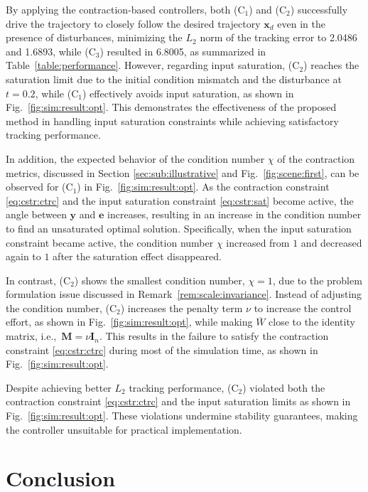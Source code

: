 \documentclass{ifacconf}
\newcommand\ie{\textrm{i.e.,\ }}
\newcommand{\oneErr}{{2.0486}}
\newcommand{\twoErr}{{1.6893}}
\newcommand{\threeErr}{{6.8005}}
\newcommand*{\mv}[1]{\boldsymbol{#1}} %
\newcommand*{\mm}[1]{\boldsymbol{#1}} %
\begin{document}
By applying the contraction-based controllers, both (C$_1$) and (C$_2$) successfully drive the trajectory to closely follow the desired trajectory $\mv{x}_d$ even in the presence of disturbances, minimizing the $L_2$ norm of the tracking error to {\oneErr} and {\twoErr}, while (C$_3$) resulted in {\threeErr}, as summarized in Table~\ref{table:performance}.
However, regarding input saturation, (C$_2$) reaches the saturation limit due to the initial condition mismatch and the disturbance at $t=0.2$, while (C$_1$) effectively avoids input saturation, as shown in Fig.~\ref{fig:sim:result:opt}.
This demonstrates the effectiveness of the proposed method in handling input saturation constraints while achieving satisfactory tracking performance.

In addition, the expected behavior of the condition number $\chi$ of the contraction metrics, discussed in Section \ref{sec:sub:illustrative} and Fig.~\ref{fig:scene:first}, can be observed for (C$_1$) in Fig.~\ref{fig:sim:result:opt}.
As the contraction constraint \eqref{eq:cstr:ctrc} and the input saturation constraint \eqref{eq:cstr:sat} become active, the angle between $\mv{y}$ and $\mv{e}$ increases, resulting in an increase in the condition number to find an unsaturated optimal solution.
Specifically, when the input saturation constraint became active, the condition number $\chi$ increased from $1$ and decreased again to $1$ after the saturation effect disappeared.

In contrast, (C$_2$) shows the smallest condition number, $\chi=1$, due to the problem formulation issue discussed in Remark~\ref{rem:scale:invariance}.
Instead of adjusting the condition number, (C$_2$) increases the penalty term $\nu$ to increase the control effort, as shown in Fig.~\ref{fig:sim:result:opt}, while making $\overline{W}$ close to the identity matrix, \ie $\mm{M}=\nu\mm{I}_n$.
This results in the failure to satisfy the contraction constraint \eqref{eq:cstr:ctrc} during most of the simulation time, as shown in Fig.~\ref{fig:sim:result:opt}.

Despite achieving better $L_2$ tracking performance, (C$_2$) violated both the contraction constraint \eqref{eq:cstr:ctrc} and the input saturation limits as shown in Fig.~\ref{fig:sim:result:opt}.
These violations undermine stability guarantees, making the controller unsuitable for practical implementation.

\section{Conclusion} \label{sec:conclusion}
\end{document}
